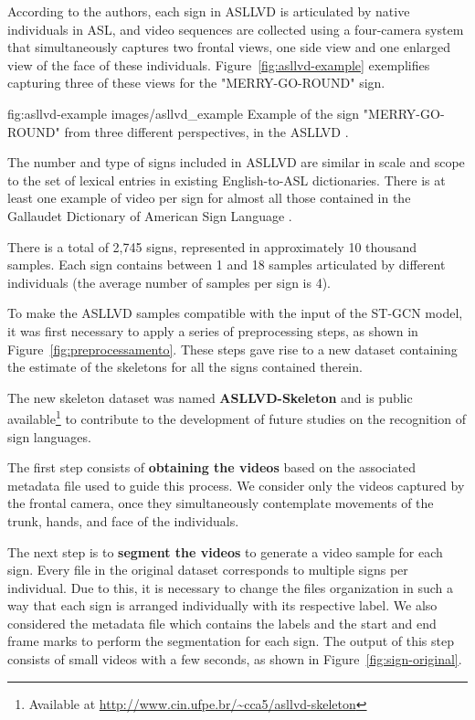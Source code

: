 According to the authors, each sign in ASLLVD is articulated by native individuals in ASL, and video sequences are collected using a four-camera system that simultaneously captures two frontal views, one side view and one enlarged view of the face of these individuals. Figure~\ref{fig:asllvd-example} exemplifies capturing three of these views for the "MERRY-GO-ROUND" sign. 

\image
    {fig:asllvd-example}
    {images/asllvd_example}
    {Example of the sign "MERRY-GO-ROUND" from three different perspectives, in the ASLLVD \cite[p. 2]{athitsos-asllvd-2008}.}
    
The number and type of signs included in ASLLVD are similar in scale and scope to the set of lexical entries in existing English-to-ASL dictionaries. There is at least one example of video per sign for almost all those contained in the Gallaudet Dictionary of American Sign Language \cite{athitsos-asllvd-2008, gallaudet-2005}.

There is a total of 2,745 signs, represented in approximately 10 thousand samples. Each sign contains between 1 and 18 samples articulated by different individuals (the average number of samples per sign is 4).

To make the ASLLVD samples compatible with the input of the ST-GCN model, it was first necessary to apply a series of preprocessing steps, as shown in Figure~\ref{fig:preprocessamento}. These steps gave rise to a new dataset containing the estimate of the skeletons for all the signs contained therein.

The new skeleton dataset was named \textbf{ASLLVD-Skeleton} and is public available\footnote{
   Available at \url{http://www.cin.ufpe.br/~cca5/asllvd-skeleton}
} to contribute to the development of future studies on the recognition of sign languages.


The first step consists of \textbf{obtaining the videos} based on the associated metadata file used to guide this process. We consider only the videos captured by the frontal camera, once they simultaneously contemplate movements of the trunk, hands, and face of the individuals.

The next step is to \textbf{segment the videos} to generate a video sample for each sign. Every file in the original dataset corresponds to multiple signs per individual. Due to this, it is necessary to change the files organization in such a way that each sign is arranged individually with its respective label. We also considered the metadata file which contains the labels and the start and end frame marks to perform the segmentation for each sign. The output of this step consists of small videos with a few seconds, as shown in Figure~\ref{fig:sign-original}.

